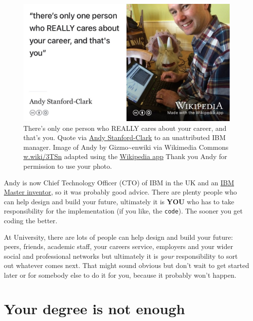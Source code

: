 \documentclass[
]{book}
\begin{document}
\begin{figure}

{\centering \includegraphics[width=0.99\linewidth]{images/nobody-cares-about-your-career-except-you2} 

}

\caption{There's only one person who REALLY cares about your career, and that's you. Quote via \href{https://en.wikipedia.org/wiki/Andy_Stanford-Clark}{Andy Stanford-Clark} \citep{andystanfordclark} to an unattributed IBM manager. Image of Andy by Gizmo\textasciitilde enwiki via Wikimedia Commons \href{https://w.wiki/3TSn}{w.wiki/3TSn} adapted using the \href{https://apps.apple.com/us/app/wikipedia/id324715238}{Wikipedia app} Thank you Andy for permission to use your photo.}\label{fig:andysc-fig}
\end{figure}



Andy is now Chief Technology Officer (CTO) of IBM in the UK and an \href{https://en.wikipedia.org/wiki/IBM_Master_Inventor}{IBM Master inventor}, so it was probably good advice. There are plenty people who can help design and build your future, ultimately it is \textbf{YOU} who has to take responsibility for the implementation (if you like, the \texttt{code}). The sooner you get coding the better.

At University, there are lots of people can help design and build your future: peers, friends, academic staff, your careers service, employers and your wider social and professional networks but ultimately it is \emph{your} responsibility to sort out whatever comes next. That might sound obvious but don't wait to get started later or for somebody else to do it for you, because it probably won't happen.

\hypertarget{entitled}{%
\section{Your degree is not enough}\label{entitled}}
\end{document}
